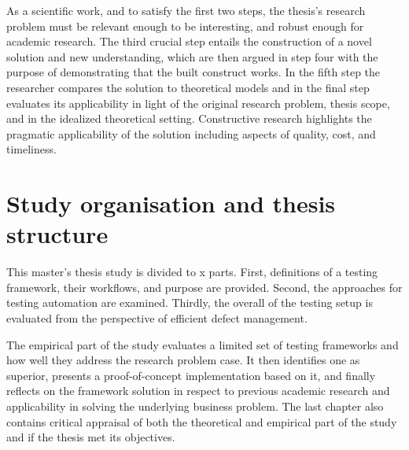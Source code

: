\documentclass[12pt,a4paper,oneside,pdftex]{report}
\begin{document}
As a scientific work, and to satisfy the first two steps, the thesis's research problem must be relevant enough to be interesting, and robust enough for academic research. The third crucial step entails the construction of a novel solution and new understanding, which are then argued in step four with the purpose of demonstrating that the built construct works. In the fifth step the researcher compares the solution to theoretical models and in the final step evaluates its applicability in light of the original research problem, thesis scope, and in the idealized theoretical setting. Constructive research highlights the pragmatic applicability of the solution including aspects of quality, cost, and timeliness.

\begin{comment}
Below to reference works from SoberIT slideset.

Kasanen, Eero, Lukka Kari, and Arto Siitonen. 1993. The Constructive Approach in Management Accounting Research. Journal of Management Accounting Research, 5 (1), pp. 243-263.

Shaw, M. 2001. The Coming-of-Age of Software Architecture Research. Proceedings of ICSE-2001, pp. 657-664. Los Alamitos, CA: IEEE Computer Society Press.
\end{comment}

\section{Study organisation and thesis structure}
\label{section:structure}
This master's thesis study is divided to x parts. First, definitions of a testing framework, their workflows, and purpose are provided. Second, the approaches for testing automation are examined. Thirdly, the overall of the testing setup is evaluated from the perspective of efficient defect management. 

The empirical part of the study evaluates a limited set of testing frameworks and how well they address the research problem case. It then identifies one as superior, presents a proof-of-concept implementation based on it, and finally reflects on the framework solution in respect to previous academic research and applicability in solving the underlying business problem. The last chapter also contains critical appraisal of both the theoretical and empirical part of the study and if the thesis met its objectives.

% 
\end{document}
